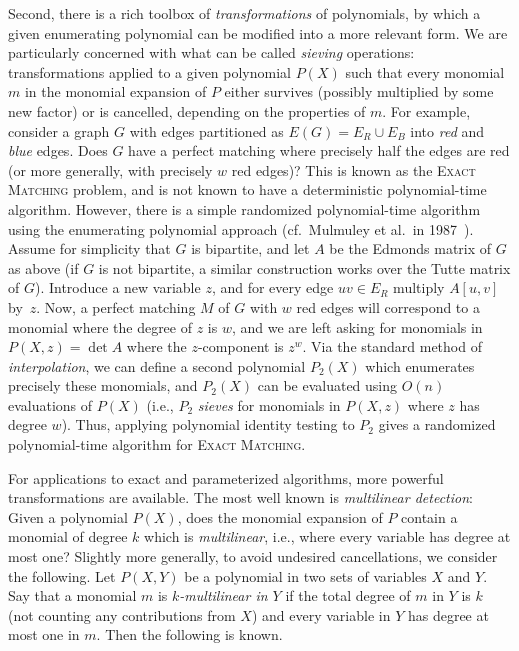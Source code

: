 \documentclass[10pt,a4paper]{article}
\begin{document}
Second, there is a rich toolbox of \emph{transformations} of polynomials,
by which a given enumerating polynomial can be modified into a more
relevant form. We are particularly concerned with what can be called
\emph{sieving} operations: transformations applied to a given
polynomial $P(X)$ such that every monomial $m$ in the monomial expansion
of $P$ either survives (possibly multiplied by some new factor)
or is cancelled, depending on the properties of $m$. 
For example, consider a graph $G$ with edges partitioned as $E(G)=E_R \cup E_B$ 
into \emph{red} and \emph{blue} edges. Does $G$ have a perfect
matching where precisely half the edges are red (or more generally,
with precisely $w$ red edges)? 
This is known as the \textsc{Exact Matching} problem, and is
not known to have a deterministic polynomial-time algorithm. However,
there is a simple randomized polynomial-time algorithm using the
enumerating polynomial approach (cf.~Mulmuley et al.\ in 1987~\cite{MulmuleyVV87matching}).
Assume for simplicity that $G$ is
bipartite, and let $A$ be the Edmonds matrix of $G$ as above (if $G$
is not bipartite, a similar construction works over the Tutte matrix of $G$).
Introduce a new variable $z$, and for every edge $uv \in E_R$ multiply
$A[u,v]$ by~$z$. Now, a perfect matching $M$ of $G$ with $w$ red edges
will correspond to a monomial where the degree of $z$ is $w$, and we
are left asking for monomials in $P(X,z)=\det A$ where the $z$-component
is $z^w$. Via the standard method of \emph{interpolation}, we can define
a second polynomial $P_2(X)$ which enumerates precisely these monomials,
and $P_2(X)$ can be evaluated using $O(n)$ evaluations of $P(X)$ (i.e.,
$P_2$ \emph{sieves} for monomials in $P(X,z)$ where $z$ has degree $w$).
Thus, applying polynomial identity testing to $P_2$ gives a randomized
polynomial-time algorithm for \textsc{Exact Matching}. 

For applications to exact and parameterized algorithms, more powerful
transformations are available. The most well known is
\emph{multilinear detection}: Given a polynomial $P(X)$, does the
monomial expansion of $P$ contain a monomial of degree $k$ which is
\emph{multilinear}, i.e., where every variable has degree at most one?
Slightly more generally, to avoid undesired cancellations, we consider
the following. Let $P(X,Y)$ be a polynomial in two sets of variables
$X$ and $Y$. Say that a monomial $m$ is \emph{$k$-multilinear in $Y$}
if the total degree of $m$ in $Y$ is $k$ (not counting any
contributions from $X$) and every variable in $Y$ has degree at most
one in $m$. Then the following is known. 
\end{document}
